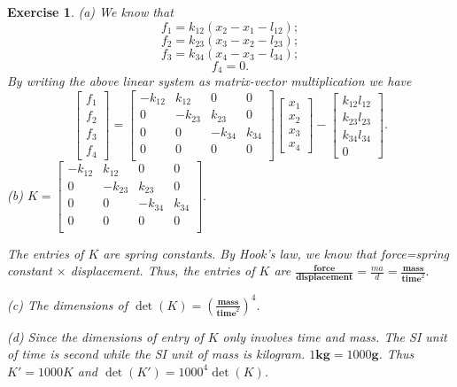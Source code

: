 \documentclass[paper=a4, fontsize=11pt]{scrartcl} %
\numberwithin{equation}{section} %
\numberwithin{figure}{section} %
\numberwithin{table}{section} %
\newtheorem{exercise}{Exercise}
\numberwithin{exercise}{section}
\begin{document}
\begin{exercise}
(a) We know that 
$$f_1=k_{12}(x_2-x_1-l_{12});$$
$$f_2=k_{23}(x_3-x_2-l_{23});$$
$$f_3=k_{34}(x_4-x_3-l_{34});$$
$$f_4=0.$$
By writing the above linear system as matrix-vector multiplication we have
$$\begin{bmatrix}
f_1\\
f_2\\
f_3\\
f_4
\end{bmatrix}=\begin{bmatrix}
- k_{12} & k_{12} & 0 & 0 \\ 0 & -k_{23}& k_{23} & 0 \\ 0 & 0 & -k_{34} & k_{34} \\ 0 & 0& 0& 0\\
\end{bmatrix}\begin{bmatrix}
x_1\\x_2\\x_3\\x_4
\end{bmatrix} -\begin{bmatrix}
k_{12}l_{12}\\k_{23}l_{23}\\k_{34}l_{34}\\ 0
\end{bmatrix}.$$
(b) $K=\begin{bmatrix}
- k_{12} & k_{12} & 0 & 0 \\ 0 & -k_{23}& k_{23} & 0 \\ 0 & 0 & -k_{34} & k_{34} \\ 0 & 0& 0& 0\\
\end{bmatrix}.$

The entries of $K$ are spring constants. By Hook's law, we know that  force=spring constant $\times$ displacement.
Thus, the entries of $K$ are $\frac{\mathbf{force}}{\mathbf{displacement}}=\frac{ma}{d}=\frac{\mathbf{mass}}{\mathbf{time}^2}.$

(c) The dimensions of $\det(K)=\left( \frac{\mathbf{mass}}{\mathbf{time}^2 }  \right)^4.$

(d) Since the dimensions of entry of $K$ only involves time and mass. The SI unit of time is second while the SI unit of mass is kilogram. $1 \mathbf{kg}=1000 \mathbf{g}$. Thus $K'=1000 K$  and $\det(K')=1000^4 \det(K)$.
\end{exercise}
\end{document}
